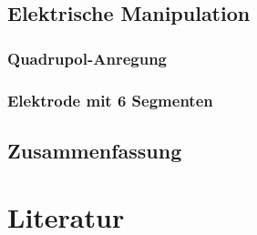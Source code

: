 \documentclass[numbers=noenddot,a4paper]{scrartcl}
\begin{document}
	\newpage

        \subsection{Elektrische Manipulation}

            \subsubsection{Quadrupol-Anregung}

            \subsubsection{Elektrode mit 6 Segmenten}

         \subsection{Zusammenfassung}

	\newpage

	\section{Literatur}\label{sec:lit}

		
		

%

%		
%
\end{document}

